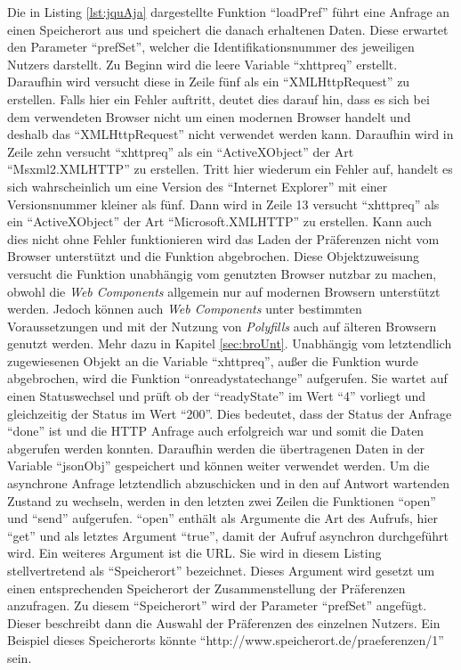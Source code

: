 \documentclass[12pt, paper=a4, bibtotoc, toc=listof, headsepline=true]{scrreprt}
\begin{document}
Die in Listing \ref{lst:jquAja} dargestellte Funktion \enquote{loadPref} führt eine Anfrage an einen Speicherort aus und speichert die danach erhaltenen Daten. Diese erwartet den Parameter \enquote{prefSet}, welcher die Identifikationsnummer des jeweiligen Nutzers darstellt. Zu Beginn wird die leere Variable \enquote{xhttpreq} erstellt. Daraufhin wird versucht diese in Zeile fünf als ein \enquote{XMLHttpRequest} zu erstellen. Falls hier ein Fehler auftritt, deutet dies darauf hin, dass es sich bei dem verwendeten Browser nicht um einen modernen Browser handelt und deshalb das \enquote{XMLHttpRequest} nicht verwendet werden kann. Daraufhin wird in Zeile zehn versucht \enquote{xhttpreq} als ein \enquote{ActiveXObject} der Art \enquote{Msxml2.XMLHTTP} zu erstellen. Tritt hier wiederum ein Fehler auf, handelt es sich wahrscheinlich um eine Version des \enquote{Internet Explorer} mit einer Versionsnummer kleiner als fünf. Dann wird in Zeile 13 versucht \enquote{xhttpreq} als ein \enquote{ActiveXObject} der Art \enquote{Microsoft.XMLHTTP} zu erstellen. Kann auch dies nicht ohne Fehler funktionieren wird das Laden der Präferenzen nicht vom Browser unterstützt und die Funktion abgebrochen. Diese Objektzuweisung versucht die Funktion unabhängig vom genutzten Browser nutzbar zu machen, obwohl die \emph{Web Components} allgemein nur auf modernen Browsern unterstützt werden. Jedoch können auch \emph{Web Components} unter bestimmten Voraussetzungen und mit der Nutzung von \emph{Polyfills} auch auf älteren Browsern genutzt werden. Mehr dazu in Kapitel \ref{sec:broUnt}. Unabhängig vom letztendlich zugewiesenen Objekt an die Variable \enquote{xhttpreq}, außer die Funktion wurde abgebrochen,  wird die Funktion \enquote{onreadystatechange} aufgerufen. Sie wartet auf einen Statuswechsel und prüft ob der \enquote{readyState} im Wert \enquote{4} vorliegt und gleichzeitig der Status im Wert \enquote{200}. Dies bedeutet, dass der Status der Anfrage \enquote{done} ist und die \ac{HTTP} Anfrage auch erfolgreich war und somit die Daten abgerufen werden konnten. Daraufhin werden die übertragenen Daten in der Variable \enquote{jsonObj} gespeichert und können weiter verwendet werden. Um die asynchrone Anfrage letztendlich abzuschicken und in den auf Antwort wartenden Zustand zu wechseln, werden in den letzten zwei Zeilen die Funktionen \enquote{open} und \enquote{send} aufgerufen. \enquote{open} enthält als Argumente die Art des Aufrufs, hier \enquote{get} und als letztes Argument \enquote{true}, damit der Aufruf asynchron durchgeführt wird. Ein weiteres Argument ist die \ac{URL}. Sie wird in diesem Listing stellvertretend als \enquote{Speicherort} bezeichnet. Dieses Argument wird gesetzt um einen entsprechenden Speicherort der Zusammenstellung der Präferenzen anzufragen. Zu diesem \enquote{Speicherort} wird der Parameter \enquote{prefSet} angefügt. Dieser beschreibt dann die Auswahl der Präferenzen des einzelnen Nutzers. Ein Beispiel dieses
\newline 
Speicherorts könnte \enquote{http://www.speicherort.de/praeferenzen/1} sein\cite{xmlhttp}.
		
\end{document}
